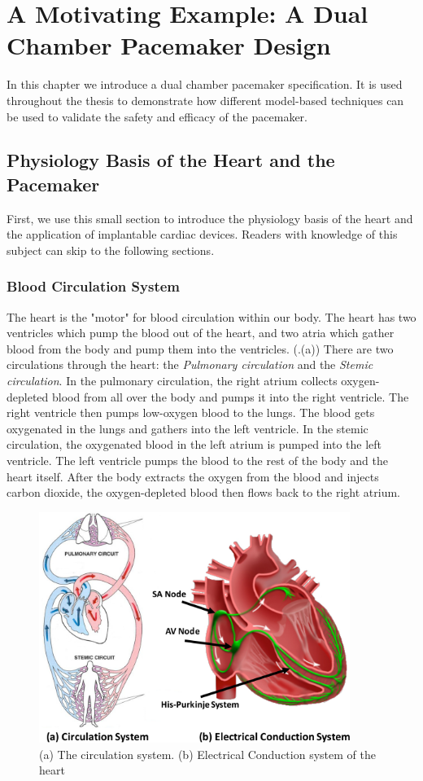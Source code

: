 \chapter{A Motivating Example: A Dual Chamber Pacemaker Design}
In this chapter we introduce a dual chamber pacemaker specification.
It is used throughout the thesis to demonstrate how different model-based techniques can be used to validate the safety and efficacy of the pacemaker.
\section{Physiology Basis of the Heart and the Pacemaker}
First, we use this small section to introduce the physiology basis of the heart and the application of implantable cardiac devices. Readers with knowledge of this subject can skip to the following sections.
\subsection{Blood Circulation System}
The heart is the "motor" for blood circulation within our body. The heart has two ventricles which pump the blood out of the heart, and two atria which gather blood from the body and pump them into the ventricles. (.(a)) There are two circulations through the heart: the \emph{Pulmonary circulation} and the \emph{Stemic circulation}. In the pulmonary circulation, the right atrium collects oxygen-depleted blood from all over the body and pumps it into the right ventricle. The right ventricle then pumps low-oxygen blood to the lungs. The blood gets oxygenated in the lungs and gathers into the left ventricle. In the stemic circulation, the oxygenated blood in the left atrium is pumped into the left ventricle. The left ventricle pumps the blood to the rest of the body and the heart itself. After the body extracts the oxygen from the blood and injects carbon dioxide, the oxygen-depleted blood then flows back to the right atrium.
\begin{figure}[!t]
\centering
		\includegraphics[width=0.9\textwidth]{figs/circulation.pdf}
		
\caption{\small (a) The circulation system. (b) Electrical Conduction system of the heart}
\label{fig:circulation}
\end{figure} 
